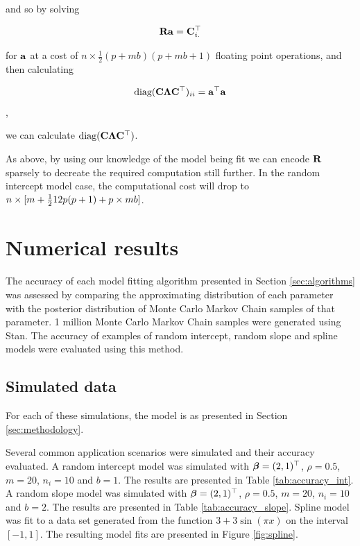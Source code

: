 \documentclass[times, doublespace]{anzsauth}
\begin{document}
	\noindent and so by solving
	
	\[
		{\bf R} {\bf a} = {\bf C}_{i .}^\top
	\]
	
	\noindent for ${\bf a}$ at a cost of $n \times \frac{1}{2} (p + m b) (p + m b + 1)$ floating point operations, and 
	then calculating
	
	\[
		\text{diag}({\bf C} {\boldsymbol \Lambda} {\bf C}^\top)_{ii} = {\bf a}^\top {\bf a}
	\],
	
	\noindent we can calculate $\text{diag}({\bf C} {\boldsymbol \Lambda} {\bf C}^\top)$.
	
	\noindent As above, by using our knowledge of the model being fit we can encode ${\bf R}$ sparsely to decreate
	the required   computation still further. In the random intercept model case, the computational cost will drop
	to   $n \times [m + \tfrac{1}{2}{1}{2} p (p + 1) + p \times m b]$.
	
	\section{Numerical results}
	\label{sec:results}
		
	The accuracy of each model fitting algorithm presented in Section \ref{sec:algorithms} was assessed by
	comparing the approximating distribution of each parameter with the posterior distribution of Monte Carlo
	Markov Chain samples of that parameter. 1 million Monte Carlo Markov Chain samples were generated using Stan.
	The accuracy of examples of random intercept, random slope and spline models were evaluated using this method.
		
	\subsection{Simulated data}
		
	For each of these simulations, the model is as presented in Section \ref{sec:methodology}.
		
	\noindent Several common application scenarios were simulated and their accuracy evaluated. A random intercept model was simulated with ${\boldsymbol \beta} = (2, 1)^\top$, $\rho = 0.5$, $m = 20$, $n_i = 10$ and $b = 1$. The results are
	presented in Table \ref{tab:accuracy_int}. A random slope model was simulated with ${\boldsymbol \beta} = (2, 1)^\top$,
	$\rho = 0.5$, $m = 20$, $n_i = 10$ and $b = 2$. The results are presented in Table \ref{tab:accuracy_slope}.
	Spline model was fit to a data set generated from the function $3 + 3 \sin{(\pi x)}$ on the interval $[-1,
	1]$. The resulting model fits are presented in Figure \ref{fig:spline}.
		
\end{document}
